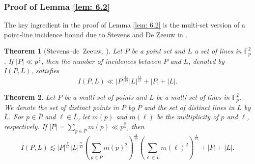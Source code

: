 \documentclass[11pt]{article}
\newtheorem{theorem}{Theorem}[section]
\begin{document}
\subsubsection*{Proof of Lemma \ref{lem: 6.2}}
The key ingredient in the proof of Lemma \ref{lem: 6.2} is the multi-set version of a point-line incidence bound due to Stevens and De Zeeuw in \cite{SdZ}.
\begin{theorem}[Stevens--de~Zeeuw, \cite{SdZ}]\label{frank}
Let $P$ be a point set and $L$ a set of lines in $\mathbb{F}_p^2$. If $|P|\ll p^{\frac{8}{5}}$, then the number of incidences between $P$ and $L$, denoted by $I(P, L)$, satisfies 
\[I(P, L)\ll |P|^{\frac{11}{15}}|L|^{\frac{11}{15}}+|P|+|L|.\]
\end{theorem}
\begin{theorem}\label{eqn:IPLMS}
    Let $P$ be a multi-set of points and $L$ be a multi-set of lines in $\mathbb{F}_p^2$. We denote the set of distinct points in $P$ by $\overline{P}$ and the set of distinct lines in $L$ by $\overline{L}$. For $p\in \overline{P}$ and $\ell\in \overline{L}$, let $m(p)$ and $m(\ell)$ be the multiplicity of $p$ and $\ell$, respectively. If 
    $|P|=\sum_{p\in \overline{P}}m(p)\ll p^{\frac{8}{5}}$, then
\begin{equation}\label{eqan:IPLMS}
    I(P, L)\lesssim |P|^{\frac{7}{15}}|L|^{\frac{7}{15}}\left(\sum_{p\in \overline{P}}m(p)^2\right)^{\frac{4}{15}}\left(\sum_{\ell\in \overline{L}}m(\ell)^2\right)^{\frac{4}{15}}+|P|+|L|.
\end{equation}
\end{theorem}
\end{document}

